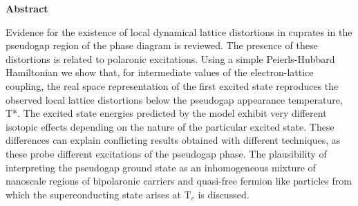 
\cleardoublepage
{}
{}
\begin{center}
\textbf{\large Abstract}
\end{center}
Evidence for the existence of local dynamical lattice distortions in cuprates in the pseudogap region of the phase diagram is reviewed. The presence of these distortions is related to polaronic excitations. Using a simple Peierls-Hubbard Hamiltonian we show that, for intermediate values of the electron-lattice coupling, the real space representation of the first excited state reproduces the observed local lattice distortions below the pseudogap appearance temperature, T*. The excited state energies predicted by the model exhibit very different isotopic effects depending on the nature of the particular excited state. These differences can explain conflicting results obtained with different techniques, as these probe different excitations of the pseudogap phase. The plausibility of interpreting the pseudogap ground state as an inhomogeneous mixture of nanoscale regions of bipolaronic carriers and quasi-free fermion like particles from which the superconducting state arises at T$_c$ is discussed.
